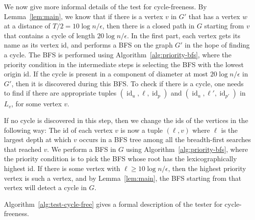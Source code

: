 \documentclass[11pt]{article}
\DeclareMathOperator{\id}{id}
\begin{document}
We now give more informal details of the test for cycle-freeness. By Lemma~\ref{lem:main}, we
know that if there is a vertex $v$ in $G'$ that has a vertex $w$ at a distance of $T/2=10\log
n/\epsilon$, then there is a closed path in $G$ starting from $v$ that contains a cycle of length
$20\log n/\epsilon$. In the first part, each vertex gets its name as its vertex id, and performs a
BFS on the graph $G'$ in the hope of finding a cycle. The BFS is performed using
Algorithm~\ref{alg:priority-bfs}, where the priority condition in the intermediate steps is
selecting the BFS with the lowest origin id. If the cycle is present in a component of diameter at
most $20\log n/\epsilon$ in $G'$, then it is discovered during this BFS. To check if there is a
cycle, one needs to find if there are appropriate tuples $(\id_{u},\ell,\id_p)$ and
$(\id_{u},\ell',\id_{p'})$ in $L_v$, for some vertex $v$.

If no cycle is discovered in this step, then we change the ids of the vertices in the following way:
The id of each vertex $v$ is now a tuple $(\ell,v)$ where $\ell$ is the largest depth at which $v$ occurs
in a BFS tree among all the breadth-first searches that reached $v$.  We perform a BFS in $G$ using
Algorithm~\ref{alg:priority-bfs}, where the priority condition is to pick the BFS whose root has the
lexicographically highest id. If there is some vertex with $\ell \geq 10\log n/\epsilon$, then the
highest priority vertex is such a vertex, and by Lemma~\ref{lem:main}, the BFS starting from that
vertex will detect a cycle in $G$.

Algorithm~\ref{alg:test-cycle-free} gives a formal description of the tester for cycle-freeness.
\end{document}
